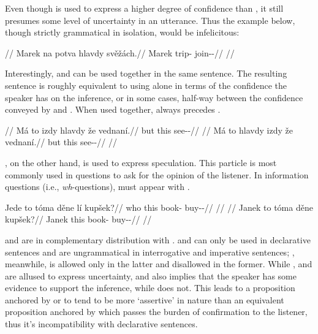 Even though  is used to express a higher degree of confidence than
, it still presumes some level of uncertainty in an utterance. Thus
the example below, though strictly grammatical in isolation, would be
infelicitous:

\pex
\begingl
	\glpreamble {}//
	\gla \ljudge{\#}Marek na potva hlavdy svěžách.//
	\glb Marek \Loc{} trip-\Acc{} \Infer{} join-\Av{}-\Ctp{}//
	\glft {}//
\endgl
\xe

Interestingly,  and  can be used together in the same
sentence. The resulting sentence is roughly equivalent to using  alone
in terms of the confidence the speaker has on the inference, or in some cases,
half-way between the confidence conveyed by  and . When
used together,  always precedes .

\pex
\a
\begingl
	\glpreamble {}//
	\gla Má to izdy hlavdy že vednaní.//
	\glb but this \Infer{} \Infer{} \Pfv{} see-\Pv{}-\Ret{}//
	\glft {}//
\endgl
\a
\begingl
	\gla \ljudge{*}Má to hlavdy izdy že vednaní.//
	\glb but this \Infer{} \Infer{} \Pfv{} see-\Pv{}-\Ret{}//
	\glft {}//
\endgl
\xe

, on the other hand, is used to express speculation. This particle is
most commonly used in questions to ask for the opinion of the listener. In
information questions (i.e., \emph{wh}-questions),  must appear with
.

\pex
\a
\begingl
	\gla Jede to tóma děne lí kupšek?//
	\glb who this book-\Acc{} \Spec{} \Q{} buy-\Av{}-\Pf{}//
	\glft {}//
\endgl
\a
\begingl
	//
	\gla Janek to tóma děne kupšek?//
	\glb Janek this book-\Acc{} \Spec{} buy-\Av{}-\Pf{}//
	\glft {}//
\endgl
\xe

 and  are in complementary distribution with .
 and  can only be used in declarative sentences and are
ungrammatical in interrogative and imperative sentences; , meanwhile,
is allowed only in the latter and disallowed in the former. While ,
 and  are  allused to express uncertainty,  and
 also implies that the speaker has some evidence to support the
inference, while  does not. This leads to a proposition anchored by
 or  to tend to be more `assertive' in nature than an
equivalent proposition anchored by  which passes the burden of
confirmation to the listener, thus it's incompatibility with declarative
sentences.

